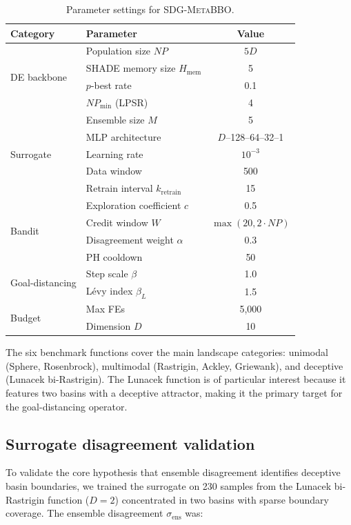 \documentclass[preprint,12pt,number]{elsarticle}
\newcommand{\sdg}{\textsc{SDG-MetaBBO}}
\newcommand{\sigmaens}{\sigma_{\text{ens}}}
\begin{document}
\begin{table}[t]
\centering
\caption{Parameter settings for \sdg{}.}
\label{tab:params}
\begin{tabular}{llc}
\toprule
Category & Parameter & Value \\
\midrule
\multirow{4}{*}{DE backbone}
 & Population size $NP$ & $5D$ \\
 & SHADE memory size $H_{\text{mem}}$ & 5 \\
 & $p$-best rate & 0.1 \\
 & $NP_{\min}$ (LPSR) & 4 \\
\midrule
\multirow{5}{*}{Surrogate}
 & Ensemble size $M$ & 5 \\
 & MLP architecture & $D$--128--64--32--1 \\
 & Learning rate & $10^{-3}$ \\
 & Data window & 500 \\
 & Retrain interval $k_{\text{retrain}}$ & 15 \\
\midrule
\multirow{4}{*}{Bandit}
 & Exploration coefficient $c$ & 0.5 \\
 & Credit window $W$ & $\max(20, 2 \cdot NP)$ \\
 & Disagreement weight $\alpha$ & 0.3 \\
 & PH cooldown & 50 \\
\midrule
\multirow{2}{*}{Goal-distancing}
 & Step scale $\beta$ & 1.0 \\
 & L\'evy index $\beta_L$ & 1.5 \\
\midrule
\multirow{2}{*}{Budget}
 & Max FEs & 5{,}000 \\
 & Dimension $D$ & 10 \\
\bottomrule
\end{tabular}
\end{table}

The six benchmark functions cover the main landscape categories: unimodal (Sphere, Rosenbrock), multimodal (Rastrigin, Ackley, Griewank), and deceptive (Lunacek bi-Rastrigin). The Lunacek function is of particular interest because it features two basins with a deceptive attractor, making it the primary target for the goal-distancing operator.

\subsection{Surrogate disagreement validation}
\label{sec:surrogate_validation}

To validate the core hypothesis that ensemble disagreement identifies deceptive basin boundaries, we trained the surrogate on 230 samples from the Lunacek bi-Rastrigin function ($D = 2$) concentrated in two basins with sparse boundary coverage. The ensemble disagreement $\sigmaens$ was:
\end{document}
